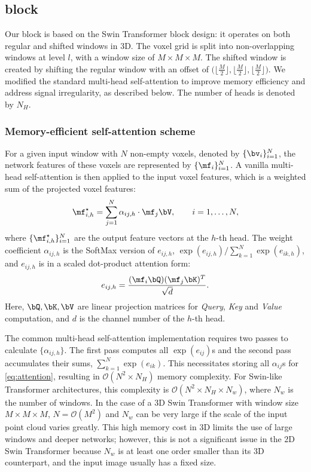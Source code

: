 \documentclass[10pt,twocolumn,letterpaper]{article}
\begin{document}
\subsection{{\SST} block} \label{subsec:block}
Our {\SST} block is based on the Swin Transformer block design: it operates on both regular and shifted windows in 3D. The voxel grid is split into non-overlapping windows at level $l$, with a window size of $M \times M \times M$. The shifted window is created by shifting the regular window with an offset of $\bigl(\lfloor \frac{M}{2}\rfloor,\lfloor \frac{M}{2}\rfloor,\lfloor \frac{M}{2}\rfloor\bigr)$. We modified the standard multi-head self-attention to improve memory efficiency and address signal irregularity, as described below. The number of heads is denoted by $N_H$.


\subsubsection{Memory-efficient self-attention scheme}

For a given input window with $N$ non-empty voxels, denoted by $\{\bv_i\}_{i=1}^N$, the network features of these voxels are represented by $\{\mf_i\}_{i=1}^N$. A vanilla multi-head self-attention is then applied to the input voxel features, which is a weighted sum of the projected voxel features:
\begin{equation}\label{eq:attention}
    \mf^\star_{i,h}  = \sum_{j=1}^N \alpha_{ij,h} \cdot \mf_j \bV, \qquad i=1,\ldots, N,
\end{equation}
 where $\{\mf^\star_{i,h}\}_{i=1}^N$ are the output feature vectors at the $h$-th head. The weight coefficient $\alpha_{ij,h}$ is the SoftMax version of $e_{ij,h}$, \ie $\exp(e_{ij,h})/\sum_{k=1}^N \exp(e_{ik,h})$, and $e_{ij,h}$ is in a scaled dot-product attention form:
 \begin{equation}
    e_{ij,h} = \dfrac{(\mf_i \bQ) (\mf_j \bK)^T}{\sqrt{d}}.
\end{equation}
Here, $\bQ, \bK, \bV$ are linear projection matrices for \emph{Query}, \emph{Key} and \emph{Value} computation, and $d$ is the channel number of the $h$-th head.

The common multi-head self-attention implementation requires two passes to calculate $\{\alpha_{ij,h}\}$. The first pass computes all $\exp(e_{ij})$s and the second pass accumulates their sums, \ie $\sum_{k=1}^N\exp(e_{ik})$. This necessitates storing all $\alpha_{ij}$s for \cref{eq:attention}, resulting in $\mathcal{O}(N^2 \times N_H)$ memory complexity. For Swin-like Transformer architectures, this complexity is $\mathcal{O}(N^2 \times N_H \times N_w)$, where $N_w$ is the number of windows. In the case of a 3D Swin Transformer with window size $M\times M \times M$, $N = \mathcal{O}(M^2)$ and $N_w$ can be very large if the scale of the input point cloud varies greatly. This high memory cost in 3D limits the use of large windows and deeper networks; however, this is not a significant issue in the 2D Swin Transformer because $N_w$ is at least one order smaller than its 3D counterpart, and the input image usually has a fixed size.
\end{document}
